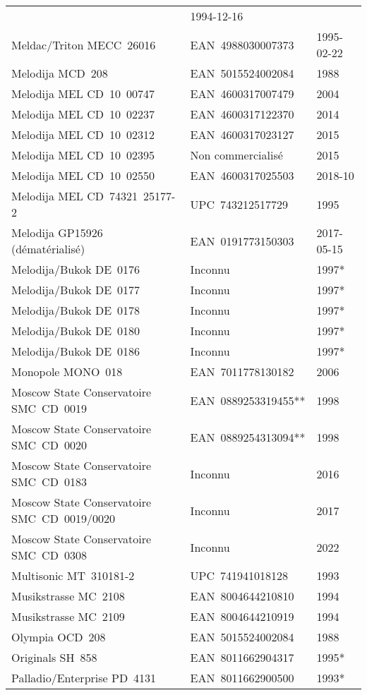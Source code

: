 {\begin{longtable}[c]{lll}
 & 1994-12-16 \\
 Meldac/Triton MECC~26016
 & EAN~4988030007373
 & 1995-02-22 \\
 Melodija MCD~208
 & EAN~5015524002084
 & 1988 \\
 Melodija MEL CD~10~00747
 & EAN~4600317007479
 & 2004 \\
 Melodija MEL CD~10~02237
 & EAN~4600317122370
 & 2014 \\
 Melodija MEL CD~10~02312
 & EAN~4600317023127
 & 2015 \\
 Melodija MEL CD~10~02395
 & Non commercialisé
 & 2015 \\
 Melodija MEL CD~10~02550
 & EAN~4600317025503
 & 2018-10 \\
 Melodija MEL CD~74321~\hbox{25177-2}
 & UPC~743212517729
 & 1995 \\
 Melodija GP15926 (dématérialisé)
 & EAN~0191773150303
 & 2017-05-15 \\
 Melodija/Bukok DE~0176
 & Inconnu
 & 1997* \\
 Melodija/Bukok DE~0177
 & Inconnu
 & 1997* \\
 Melodija/Bukok DE~0178
 & Inconnu
 & 1997* \\
 Melodija/Bukok DE~0180
 & Inconnu
 & 1997* \\
 Melodija/Bukok DE~0186
 & Inconnu
 & 1997* \\
 Monopole MONO~018
 & EAN~7011778130182
 & 2006 \\
 Moscow State Conservatoire SMC~CD~0019
 & EAN~0889253319455**
 & 1998 \\
 Moscow State Conservatoire SMC~CD~0020
 & EAN~0889254313094**
 & 1998 \\
 Moscow State Conservatoire SMC~CD~0183
 & Inconnu
 & 2016 \\
 Moscow State Conservatoire SMC~CD~0019/0020
 & Inconnu
 & 2017 \\
 Moscow State Conservatoire SMC~CD~0308
 & Inconnu
 & 2022 \\
 Multisonic MT~\hbox{310181-2}
 & UPC~741941018128
 & 1993 \\
 Musikstrasse MC~2108
 & EAN~8004644210810
 & 1994 \\
 Musikstrasse MC~2109
 & EAN~8004644210919
 & 1994 \\
 Olympia OCD~208
 & EAN~5015524002084
 & 1988 \\
 Originals SH~858
 & EAN~8011662904317
 & 1995* \\
 Palladio/Enterprise PD~4131
 & EAN~8011662900500
 & 1993* \\

\end{longtable}}
